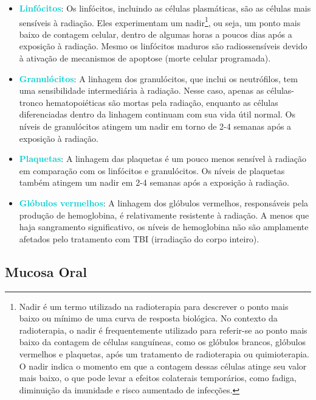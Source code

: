 \documentclass[11pt,a4paper]{article}
\begin{document}
	\begin{itemize}
		\item \textcolor{DarkTurquoise}{\textbf{Linfócitos}}: Os linfócitos, incluindo as células plasmáticas, são as células mais sensíveis à radiação. Eles experimentam um nadir\footnote{Nadir é um termo utilizado na radioterapia para descrever o ponto mais baixo ou mínimo de uma curva de resposta biológica. No contexto da radioterapia, o nadir é frequentemente utilizado para referir-se ao ponto mais baixo da contagem de células sanguíneas, como os glóbulos brancos, glóbulos vermelhos e plaquetas, após um tratamento de radioterapia ou quimioterapia. O nadir indica o momento em que a contagem dessas células atinge seu valor mais baixo, o que pode levar a efeitos colaterais temporários, como fadiga, diminuição da imunidade e risco aumentado de infecções. }, ou seja, um ponto mais baixo de contagem celular, dentro de algumas horas a poucos dias após a exposição à radiação. Mesmo os linfócitos maduros são radiossensíveis devido à ativação de mecanismos de apoptose (morte celular programada).

		\item \textcolor{DarkTurquoise}{\textbf{Granulócitos}}: A linhagem dos granulócitos, que inclui os neutrófilos, tem uma sensibilidade intermediária à radiação. Nesse caso, apenas as células-tronco hematopoiéticas são mortas pela radiação, enquanto as células diferenciadas dentro da linhagem continuam com sua vida útil normal. Os níveis de granulócitos atingem um nadir em torno de 2-4 semanas após a exposição à radiação.

		\item \textcolor{DarkTurquoise}{\textbf{Plaquetas}}: A linhagem das plaquetas é um pouco menos sensível à radiação em comparação com os linfócitos e granulócitos. Os níveis de plaquetas também atingem um nadir em 2-4 semanas após a exposição à radiação.

		\item \textcolor{DarkTurquoise}{\textbf{Glóbulos vermelhos}}: A linhagem dos glóbulos vermelhos, responsáveis pela produção de hemoglobina, é relativamente resistente à radiação. A menos que haja sangramento significativo, os níveis de hemoglobina não são amplamente afetados pelo tratamento com TBI (irradiação do corpo inteiro).
	\end{itemize}

\subsection*{Mucosa Oral}
\end{document}
